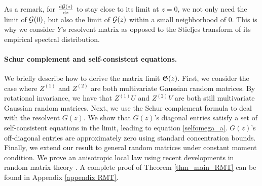 As a remark, for $\frac{\dd \cal G(z)}{\dd z}$ to stay close to its limit at $z = 0$, we not only need the limit of $\cal G(0)$, but also the limit of $\cal G(z)$ within a small neighborhood of $0$.
This is why we consider $Y$'s resolvent matrix as opposed to the Stieljes transform of its empirical spectral distribution.

\paragraph{Schur complement and self-consistent equations.}
We briefly describe how to derive the matrix limit $\Gi(z)$.
First, we consider the case where $Z^{(1)}$ and $Z^{(2)}$ are both multivariate Gaussian random matrices.
By rotational invariance, we have that $Z^{(1)} U$ and $Z^{(2)} V$ are both still multivariate Gaussian random matrices.
Next, we use the Schur complement formula to deal with the resolvent $G(z)$.
We show that $G(z)$'s diagonal entries satisfy a set of self-consistent equations in the limit, leading to equation \eqref{selfomega_a}.
$G(z)$'s off-diagonal entries are approximately zero using standard concentration bounds.
Finally, we extend our result to general random matrices under constant moment condition.
We prove an anisotropic local law using recent developments in random matrix theory \cite{erdos2017dynamical,Anisotropic}.
A complete proof of Theorem \ref{thm_main_RMT} can be found in Appendix \ref{appendix RMT}.
